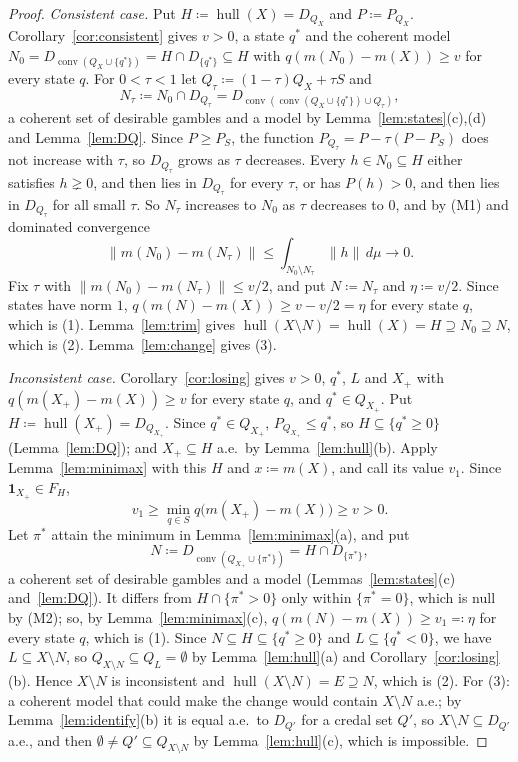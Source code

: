 \documentclass[11pt]{article}
\newcommand{\one}{\mathbf{1}}
\newcommand{\hull}{\operatorname{hull}}
\DeclareMathOperator{\conv}{conv}
\theoremstyle{plain}
\theoremstyle{definition}
\begin{document}
\begin{proof}
\emph{Consistent case.} Put $H\coloneqq\hull(X)=D_{Q_X}$ and $P\coloneqq P_{Q_X}$.
Corollary~\ref{cor:consistent} gives $v>0$, a state $q^\ast$ and the coherent model
$N_0=D_{\conv(Q_X\cup\{q^\ast\})}=H\cap D_{\{q^\ast\}}\subseteq H$ with $q(m(N_0)-m(X))\ge v$
for every state $q$. For $0<\tau<1$ let $Q_\tau\coloneqq(1-\tau)Q_X+\tau S$ and
\[
  N_\tau\coloneqq N_0\cap D_{Q_\tau}=D_{\conv(\conv(Q_X\cup\{q^\ast\})\cup Q_\tau)},
\]
a coherent set of desirable gambles and a model by Lemma~\ref{lem:states}(c),(d) and
Lemma~\ref{lem:DQ}. Since $P\ge P_S$, the function $P_{Q_\tau}=P-\tau(P-P_S)$ does not increase
with $\tau$, so $D_{Q_\tau}$ grows as $\tau$ decreases. Every $h\in N_0\subseteq H$ either
satisfies $h\gneq0$, and then lies in $D_{Q_\tau}$ for every $\tau$, or has $P(h)>0$, and then
lies in $D_{Q_\tau}$ for all small $\tau$. So $N_\tau$ increases to $N_0$ as $\tau$
decreases to $0$, and by (M1) and dominated convergence
\[
  \|m(N_0)-m(N_\tau)\|\le\int_{N_0\setminus N_\tau}\|h\|\,d\mu\to0 .
\]
Fix $\tau$ with $\|m(N_0)-m(N_\tau)\|\le v/2$, and put $N\coloneqq N_\tau$ and $\eta\coloneqq
v/2$. Since states have norm $1$, $q(m(N)-m(X))\ge v-v/2=\eta$ for every state $q$, which is
(1). Lemma~\ref{lem:trim} gives $\hull(X\setminus N)=\hull(X)=H\supseteq N_0\supseteq N$, which
is (2). Lemma~\ref{lem:change} gives (3).

\emph{Inconsistent case.} Corollary~\ref{cor:losing} gives $v>0$, $q^\ast$, $L$ and $X_+$ with
$q(m(X_+)-m(X))\ge v$ for every state $q$, and $q^\ast\in Q_{X_+}$. Put $H\coloneqq\hull(X_+)=
D_{Q_{X_+}}$. Since $q^\ast\in Q_{X_+}$, $P_{Q_{X_+}}\le q^\ast$, so $H\subseteq
\{q^\ast\ge0\}$ (Lemma~\ref{lem:DQ}); and $X_+\subseteq H$ a.e.\ by Lemma~\ref{lem:hull}(b). Apply Lemma~\ref{lem:minimax} with this
$H$ and $x\coloneqq m(X)$, and call its value $v_1$. Since $\one_{X_+}\in F_H$,
\[
  v_1\ge\min_{q\in S}q\bigl(m(X_+)-m(X)\bigr)\ge v>0 .
\]
Let $\pi^\ast$ attain the minimum in Lemma~\ref{lem:minimax}(a), and put
\[
  N\coloneqq D_{\conv(Q_{X_+}\cup\{\pi^\ast\})}=H\cap D_{\{\pi^\ast\}},
\]
a coherent set of desirable gambles and a model (Lemmas~\ref{lem:states}(c) and~\ref{lem:DQ}).
It differs from $H\cap\{\pi^\ast>0\}$ only within $\{\pi^\ast=0\}$, which is null by (M2); so,
by Lemma~\ref{lem:minimax}(c), $q(m(N)-m(X))\ge v_1\eqqcolon\eta$ for every state $q$, which is
(1). Since $N\subseteq H\subseteq\{q^\ast\ge0\}$ and $L\subseteq\{q^\ast<0\}$, we have $L\subseteq X\setminus N$, so $Q_{X\setminus N}\subseteq
Q_L=\emptyset$ by Lemma~\ref{lem:hull}(a) and Corollary~\ref{cor:losing}(b). Hence $X\setminus
N$ is inconsistent and $\hull(X\setminus N)=E\supseteq N$, which is (2). For (3): a coherent
model that could make the change would contain $X\setminus N$ a.e.; by
Lemma~\ref{lem:identify}(b) it is equal a.e.\ to $D_{Q'}$ for a credal set $Q'$, so $X\setminus
N\subseteq D_{Q'}$ a.e., and then $\emptyset\ne Q'\subseteq Q_{X\setminus N}$ by
Lemma~\ref{lem:hull}(c), which is impossible.
\end{proof}
\end{document}

